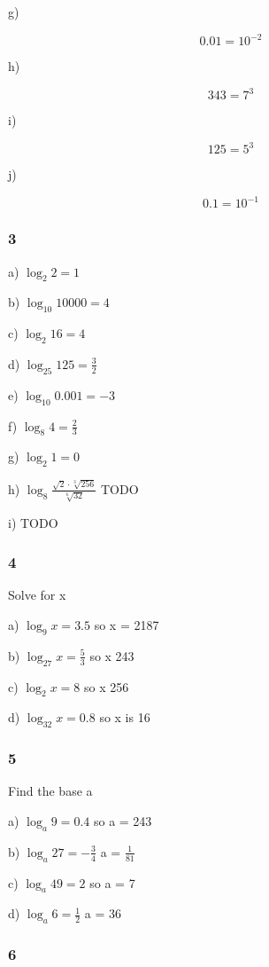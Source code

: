 \documentclass[]{report}
\begin{document}
g)

\[
0.01 = 10^{-2}
\]

h) 

\[
343 = 7^3
\]

i)

\[
125 = 5^3
\]

j)

\[
0.1 = 10^{-1}
\]

\subsubsection{3}

a) $\log_2 2 = 1$

b) $\log_{10} 10000 = 4$

c) $\log_2 16 = 4$

d) $\log_{25} 125 = \frac{3}{2}$

e) $\log_{10} 0.001 = -3$

f) $\log_8 4 = \frac{2}{3}$

g) $\log_2 1 = 0$

h) $\log_8 \frac{\sqrt{2} \cdot \sqrt[3]{256}}{\sqrt[6]{32}}$ TODO

i) TODO


\subsubsection{4}

Solve for x

a) $\log_9 x = 3.5$ so x = 2187

b) $\log_{27} x = \frac{5}{3}$ so x 243

c) $\log_2 x = 8 $ so x 256

d) $\log_{32}x = 0.8$ so x is 16

\subsubsection{5}

Find the base a

a) $\log_a 9 = 0.4$ so a = 243

b) $\log_a 27 = -\frac{3}{4}$ a = $\frac{1}{81}$

c) $\log_a 49 = 2$ so a = 7

d) $\log_a 6 = \frac{1}{2}$ a = 36

\subsubsection{6}
\end{document}

